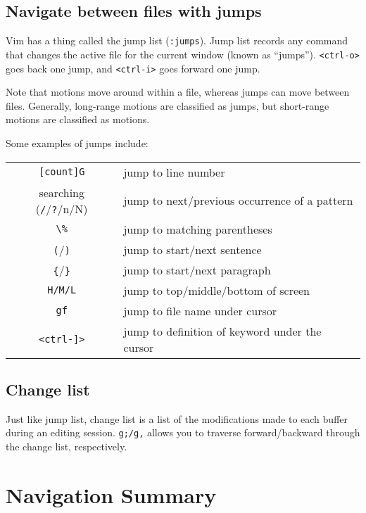 \subsection{Navigate between files with jumps}

Vim has a thing called the jump list (\verb|:jumps|).
Jump list records any command that changes the active file for the current window (known as ``jumps'').
\verb|<ctrl-o>| goes back one jump, and \verb|<ctrl-i>| goes forward one jump.

Note that motions move around within a file, whereas jumps can move between files.
Generally, long-range motions are classified as jumps, but short-range motions are classified as motions.

Some examples of jumps include:
\newline

\begin{tabular}{c|l}
    \verb|[count]G| & jump to line number\\
    searching (\verb|/|/\verb|?|/n/N) & jump to next/previous occurrence of a pattern\\
    \verb|\%| & jump to matching parentheses\\
    \verb|(|/\verb|)| & jump to start/next sentence\\
    \verb|{|/\verb|}| & jump to start/next paragraph\\
    \verb|H/M/L| & jump to top/middle/bottom of screen\\
    \verb|gf| & jump to file name under cursor\\
    \verb|<ctrl-]>| & jump to definition of keyword under the cursor \\
\end{tabular}

\subsection{Change list}

Just like jump list, change list is a list of the modifications made to each buffer during an editing session.
\verb|g;/g,| allows you to traverse forward/backward through the change list, respectively.

\section{Navigation Summary}

\begin{center}
    {\large
    }
\end{center}
